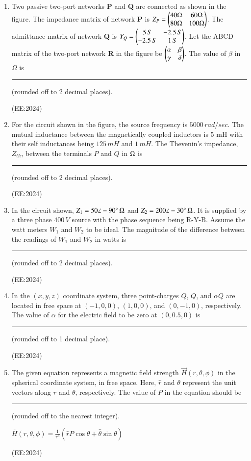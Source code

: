 \documentclass[journal,12pt,onecolumn]{IEEEtran}
\theoremstyle{remark}
\begin{document}
\begin{enumerate}
    \item Two passive two-port networks \textbf{P} and \textbf{Q} are connected as shown in the figure. The impedance matrix of network \textbf{P} is $Z_P = \begin{pmatrix} 40 \Omega & 60 \Omega \\ 80 \Omega & 100 \Omega \end{pmatrix}$. The admittance matrix of network \textbf{Q} is $Y_Q = \begin{pmatrix} 5\, S & -2.5\, S \\ -2.5\, S & 1\, S\end{pmatrix}$. Let the ABCD matrix of the two-port network \textbf{R} in the figure be $\begin{pmatrix} \alpha & \beta \\ \gamma & \delta \end{pmatrix}$. The value of $\beta$ in $\Omega$ is \rule{2.5cm}{0.4pt} (rounded off to 2 decimal places).
	    

		    \hfill{(EE:2024)}

    \item For the circuit shown in the figure, the source frequency is $5000 \, rad/sec$. The mutual inductance between the magnetically coupled inductors is 5 mH with their self inductances being $125\, mH$ and $1\, mH$. The Thevenin's impedance, $Z_{th}$, between the terminals $P$ and $Q$ in $\ohm$ is  \rule{2cm}{0.4pt} (rounded off to 2 decimal places). 
	    

	    \hfill{(EE:2024)}

    \item In the circuit shown, $Z_1 = 50\angle -90^\circ \, \ohm$ and $Z_2 = 200\angle -30^\circ \, \ohm$. It is supplied by a three phase $400\, V$ source with the phase sequence being R-Y-B. Assume the watt meters $W_1$ and $W_2$ to be ideal. The magnitude of the difference between the readings of $W_1$ and $W_2$ in watts is \rule{2.5cm}{0.4pt} (rounded off to 2 decimal places).
	    

	    \hfill{(EE:2024)}

    \item In the $(x, y, z)$ coordinate system, three point-charges $Q$, $Q$, and $\alpha Q$ are located in free space at $(-1, 0, 0)$, $(1, 0, 0)$, and $(0, -1, 0)$, respectively. The value of $\alpha$ for the electric field to be zero at $(0, 0.5, 0)$ is \rule{2.5cm}{0.4pt} (rounded off to 1 decimal place). 

	    \hfill{(EE:2024)}

    \item The given equation represents a magnetic field strength $\vec{H}(r, \theta, \phi)$ in the spherical coordinate system, in free space. Here, $\hat{r}$ and $\theta$ represent the unit vectors along $r$ and $\theta$, respectively. The value of $P$ in the equation should be  \rule{2.5cm}{0.4pt} (rounded off to the nearest integer).\\
	    \begin{center}
$\overline{H}(r, \theta, \phi) = \frac{1}{r^3} \left( \hat{r} P \cos \theta + \hat{\theta} \sin \theta \right)$
	    \end{center}

	    \hfill{(EE:2024)}
\end{enumerate}
\end{document}
